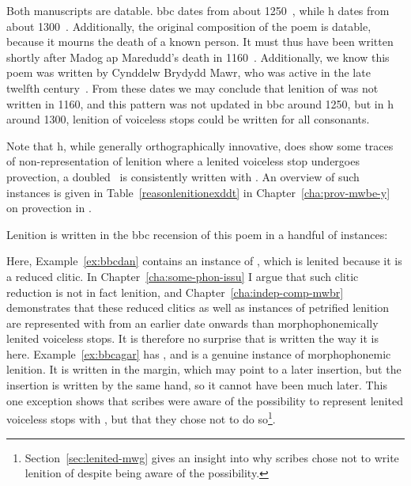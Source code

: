 Both manuscripts are datable. \Gls{bbc} dates from about 1250~\autocite[xxiv]{jones_rhagymadrodd_1982}, while \gls{h} dates from about 1300~\autocite{huws_llawysgrif_1981}. Additionally, the original composition of the poem is datable, because it mourns the death of a known person. It must thus have been written shortly after Madog ap Maredudd's death in 1160~\autocite[82]{jones_gwaith_1991}. Additionally, we know this poem was written by Cynddelw Brydydd Mawr, who was active in the late twelfth century~\autocite[xxx]{jones_gwaith_1991}. From these dates we may conclude that lenition of  was  not written in 1160, and this pattern was  not updated in \gls{bbc} around 1250, but in \gls{h} around 1300, lenition of voiceless stops could be written for all consonants.

Note that \gls{h}, while generally orthographically innovative, does show some traces of non-representation of lenition where a lenited voiceless stop undergoes provection, \ie a doubled \lT\ is consistently written with . An overview of such instances is given in Table~\ref{reasonlenitionexddt} in Chapter~\ref{cha:prov-mwbe-y} on provection in .

Lenition is written in the \gls{bbc} recension of this poem in a handful of instances:
\begin{mwl}
\end{mwl}
Here, Example~\ref{ex:bbcdan} contains an instance of , which is lenited because it is a reduced clitic. In Chapter~\ref{cha:some-phon-issu} I argue that such clitic reduction is not in fact lenition, and Chapter~\ref{cha:indep-comp-mwbr} demonstrates that these reduced clitics as well as instances of petrified lenition are represented with  from an earlier date onwards than morphophonemically lenited voiceless stops. It is therefore no surprise that  is written the way it is here. Example~\ref{ex:bbcagar} has , and is a genuine instance of morphophonemic lenition. It is written in the margin, which may point to a later insertion, but the insertion is written by the same hand, so it cannot have been much later. This one exception shows that scribes were aware of the possibility to represent lenited voiceless stops with , but that they chose not to do so\footnote{Section~\ref{sec:lenited-mwg} gives an insight into why scribes chose not to write lenition of  despite being aware of the possibility.}.

